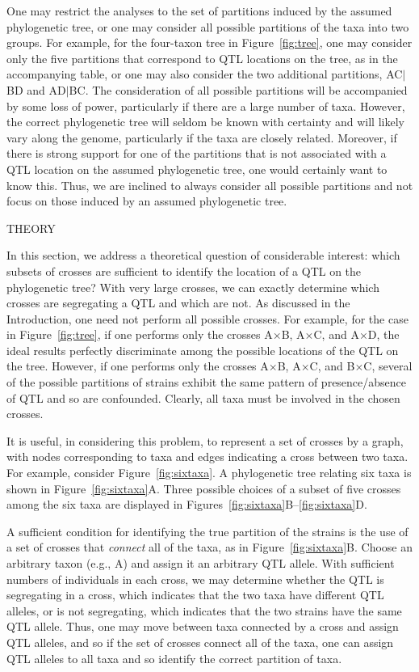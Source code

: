 \documentclass[12pt,letterpaper]{article}
\begin{document}
One may restrict the analyses to the set of partitions induced by the
assumed phylogenetic tree, or one may consider all possible partitions
of the taxa into two groups.  For example, for the four-taxon tree in
Figure~\ref{fig:tree}, one may consider only the five partitions that correspond to
QTL locations on the tree, as in the accompanying table, or one may
also consider the two additional partitions, AC$|$BD and AD$|$BC.  The
consideration of all possible partitions will be accompanied by some
loss of power, particularly if there are a large number of taxa.
However, the correct phylogenetic tree will seldom be known with
certainty and will likely vary along the genome, particularly 
if the taxa are closely related.  Moreover, if there is strong
support for one of the partitions that is not associated with a 
QTL location on the assumed phylogenetic tree,
one would certainly want to
know this.  Thus, we are inclined to always consider all possible
partitions and not focus on those induced by an
assumed phylogenetic tree.




\clearpage

\centerline{THEORY}

In this section, we address a theoretical question of considerable
interest: which subsets of crosses are sufficient to identify the
location of a QTL on the phylogenetic tree?  With very large crosses,
we can exactly determine which crosses
are segregating a QTL and which are not.  As discussed in the Introduction,
one need
not perform all possible crosses.  For example, for the case in
Figure~\ref{fig:tree}, if one performs only the crosses A$\times$B,
A$\times$C, and A$\times$D, the ideal results perfectly discriminate
among the possible locations of the QTL on the tree.  However, if one
performs only the crosses A$\times$B, A$\times$C, and B$\times$C,
several of the possible partitions of strains exhibit the same pattern
of presence/absence of QTL and so are confounded.  Clearly, all taxa
must be involved in the chosen crosses.

It is useful, in considering this problem, to represent a set of
crosses by a graph, with nodes corresponding to taxa and edges
indicating a cross between two taxa.  For example, consider
Figure~\ref{fig:sixtaxa}.  A phylogenetic tree relating six taxa is
shown in Figure~\ref{fig:sixtaxa}A.  Three possible choices of a subset
of five crosses among the six taxa are displayed in
Figures~\ref{fig:sixtaxa}B--\ref{fig:sixtaxa}D.

A sufficient condition for identifying the true partition of the
strains is the use of a set of crosses that \emph{connect\/} all of the
taxa, as in Figure~\ref{fig:sixtaxa}B.  Choose an arbitrary taxon (e.g.,
A) and assign it an arbitrary QTL allele.  With sufficient numbers of
individuals in each cross, we may determine whether the QTL is
segregating in a cross, which indicates that the two taxa have
different QTL alleles, or is not segregating, which indicates that the
two strains have the same QTL allele.  Thus, one may move between taxa 
connected by a cross and assign QTL alleles, and so if the set of
crosses connect all of the taxa, one can assign QTL alleles to all
taxa and so identify the correct partition of taxa.
\end{document}
